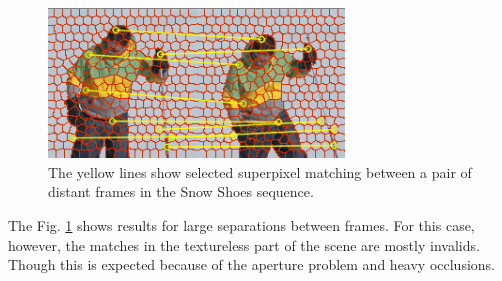    \begin{figure}[thpb]
      \centering
      \includegraphics[width=0.70\textwidth]{../images/matches_snowshoes.png}
      \caption{The yellow lines show selected superpixel
		matching between a pair of distant frames in the Snow Shoes sequence.}
      \label{figurelabel_matchessnow}
   \end{figure}   
	\setlength{\belowcaptionskip}{-10pt}
 
The Fig. \ref{figurelabel_matchessnow} shows
 results for large separations between frames. %
For this case, however, the matches in the textureless part of the scene
 are mostly invalids. Though this is expected because of the aperture problem and
 heavy occlusions.
